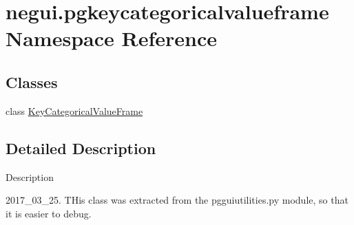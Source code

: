 \hypertarget{namespacenegui_1_1pgkeycategoricalvalueframe}{}\section{negui.\+pgkeycategoricalvalueframe Namespace Reference}
\label{namespacenegui_1_1pgkeycategoricalvalueframe}
\subsection*{Classes}
\begin{DoxyCompactItemize}
\item 
class \hyperlink{classnegui_1_1pgkeycategoricalvalueframe_1_1KeyCategoricalValueFrame}{Key\+Categorical\+Value\+Frame}
\end{DoxyCompactItemize}


\subsection{Detailed Description}
\begin{DoxyVerb}Description

2017_03_25.  THis class was extracted from the
pgguiutilities.py module, so that it is easier
to debug.
\end{DoxyVerb}
 